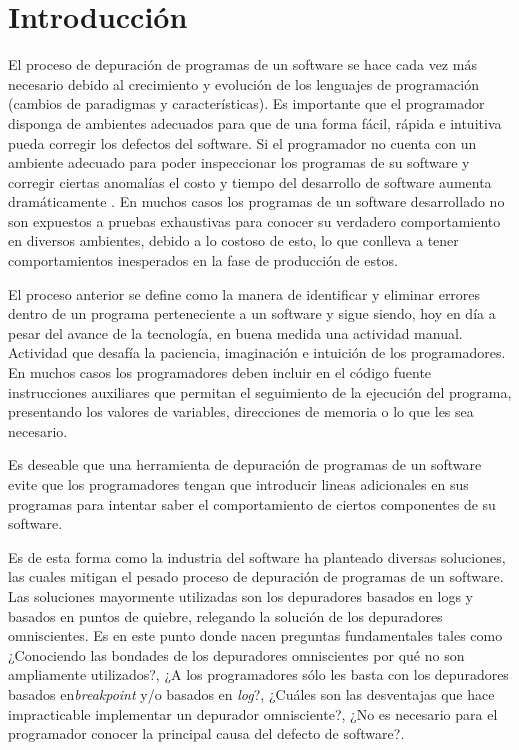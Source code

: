 \documentclass[12pt,legalpaper]{report}
\begin{document}
\newpage
\tableofcontents
\newpage
\listoffigures
\newpage
\listoftables
\newpage

\chapter{Introducción}

El proceso de depuración de programas de un software se hace cada vez más necesario debido al crecimiento y evolución de los lenguajes de programación (cambios de paradigmas y características).  Es importante que el programador disponga de ambientes adecuados para que de una forma fácil, rápida e intuitiva pueda corregir los defectos del software.  Si el programador no cuenta con un ambiente adecuado para poder inspeccionar los programas de su software y corregir ciertas anomalías el costo y tiempo del desarrollo de software aumenta dramáticamente \cite{cost}. En muchos casos los programas de un software desarrollado no son expuestos a pruebas exhaustivas para conocer su verdadero comportamiento en diversos ambientes, debido a lo costoso de esto, lo que conlleva a tener comportamientos inesperados en la fase de producción de estos.

El proceso anterior se define como la manera de identificar y eliminar errores dentro de un programa perteneciente a un software y sigue siendo, hoy en día a pesar del avance de la tecnología, en buena medida una actividad manual.  Actividad que desafía la paciencia, imaginación e intuición de los programadores.  En muchos casos los programadores deben incluir en el código fuente instrucciones auxiliares que permitan el seguimiento de la ejecución del programa, presentando los valores de variables, direcciones de memoria o lo que les sea necesario.

Es deseable que una herramienta de depuración de programas de un software evite que los programadores tengan que introducir lineas adicionales en sus programas para intentar saber el comportamiento de ciertos componentes de su software.

Es de esta forma como la industria del software ha planteado diversas soluciones, las cuales mitigan el pesado proceso de depuración de programas de un software.  Las soluciones mayormente utilizadas son los depuradores basados en logs y basados en puntos de quiebre, relegando la solución de los depuradores omniscientes.  Es en este punto donde nacen preguntas fundamentales tales como ¿Conociendo las bondades de los depuradores omniscientes por qué no son ampliamente utilizados?, ¿A los programadores sólo les basta con los depuradores basados en\textit{breakpoint} y/o basados en \textit{log}?, ¿Cuáles son las desventajas que hace impracticable implementar un depurador omnisciente?, ¿No es necesario para el programador conocer la principal causa del defecto de software?.
\end{document}
